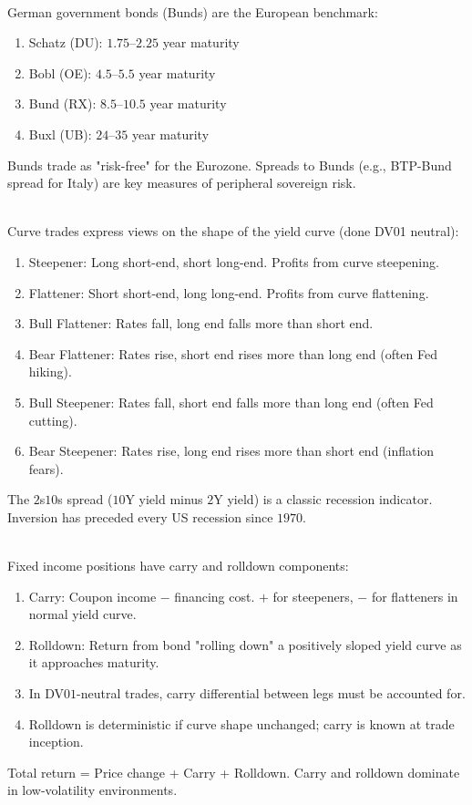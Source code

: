 \begin{remark} \\
German government bonds (Bunds) are the European benchmark:
\begin{enumerate}[label=\roman*.]
\setlength{\itemsep}{0pt}
\item Schatz (DU): $1.75$--$2.25$ year maturity
\item Bobl (OE): $4.5$--$5.5$ year maturity
\item Bund (RX): $8.5$--$10.5$ year maturity
\item Buxl (UB): $24$--$35$ year maturity
\end{enumerate}
Bunds trade as "risk-free" for the Eurozone. Spreads to Bunds (e.g., BTP-Bund spread for Italy) are key measures of peripheral sovereign risk.
\end{remark}

\begin{remark} \\
Curve trades express views on the shape of the yield curve (done DV01 neutral):
\begin{enumerate}[label=\roman*.]
\setlength{\itemsep}{0pt}
\item Steepener: Long short-end, short long-end. Profits from curve steepening.
\item Flattener: Short short-end, long long-end. Profits from curve flattening.
\item Bull Flattener: Rates fall, long end falls more than short end.
\item Bear Flattener: Rates rise, short end rises more than long end (often Fed hiking).
\item Bull Steepener: Rates fall, short end falls more than long end (often Fed cutting).
\item Bear Steepener: Rates rise, long end rises more than short end (inflation fears).
\end{enumerate}
The $2$s$10$s spread ($10$Y yield minus $2$Y yield) is a classic recession indicator. Inversion has preceded every US recession since $1970$.
\end{remark}

\begin{remark} \\
Fixed income positions have carry and rolldown components:
\begin{enumerate}[label=\roman*.]
\setlength{\itemsep}{0pt}
\item Carry: Coupon income $-$ financing cost. $+$ for steepeners, $-$ for flatteners in normal yield curve.
\item Rolldown: Return from bond "rolling down" a positively sloped yield curve as it approaches maturity.
\item In DV$01$-neutral trades, carry differential between legs must be accounted for.
\item Rolldown is deterministic if curve shape unchanged; carry is known at trade inception.
\end{enumerate}
Total return = Price change + Carry + Rolldown. Carry and rolldown dominate in low-volatility environments.
\end{remark}

